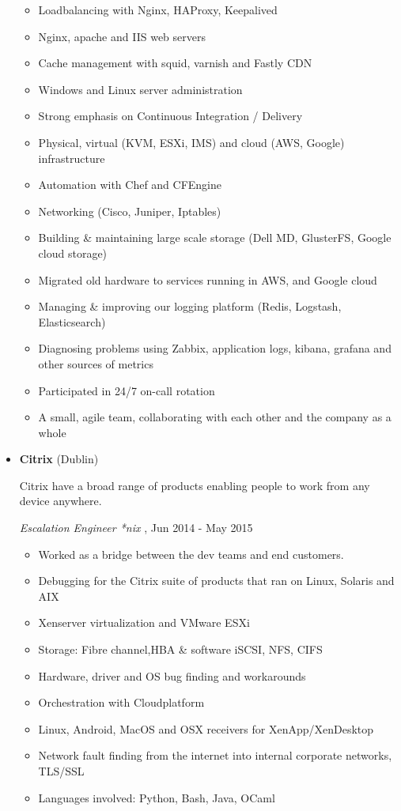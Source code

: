 \documentclass[]{article}
\providecommand{\tightlist}{%
  \setlength{\itemsep}{0pt}\setlength{\parskip}{0pt}}
\begin{document}
\begin{itemize}
  \begin{itemize}
  \tightlist
  \item
    Loadbalancing with Nginx, HAProxy, Keepalived
  \item
    Nginx, apache and IIS web servers
  \item
    Cache management with squid, varnish and Fastly CDN
  \item
    Windows and Linux server administration
  \item
    Strong emphasis on Continuous Integration / Delivery
  \item
    Physical, virtual (KVM, ESXi, IMS) and cloud (AWS, Google)
    infrastructure
  \item
    Automation with Chef and CFEngine
  \item
    Networking (Cisco, Juniper, Iptables)
  \item
    Building \& maintaining large scale storage (Dell MD, GlusterFS,
    Google cloud storage)
  \item
    Migrated old hardware to services running in AWS, and Google cloud
  \item
    Managing \& improving our logging platform (Redis, Logstash,
    Elasticsearch)
  \item
    Diagnosing problems using Zabbix, application logs, kibana, grafana
    and other sources of metrics
  \item
    Participated in 24/7 on-call rotation
  \item
    A small, agile team, collaborating with each other and the company
    as a whole
  \end{itemize}
\item
  \textbf{Citrix} (Dublin)

  Citrix have a broad range of products enabling people to work from any
  device anywhere.

  \emph{Escalation Engineer *nix }, Jun 2014 - May 2015

  \begin{itemize}
  \tightlist
  \item
    Worked as a bridge between the dev teams and end customers.
  \item
    Debugging for the Citrix suite of products that ran on Linux,
    Solaris and AIX
  \item
    Xenserver virtualization and VMware ESXi
  \item
    Storage: Fibre channel,HBA \& software iSCSI, NFS, CIFS
  \item
    Hardware, driver and OS bug finding and workarounds
  \item
    Orchestration with Cloudplatform
  \item
    Linux, Android, MacOS and OSX receivers for XenApp/XenDesktop
  \item
    Network fault finding from the internet into internal corporate
    networks, TLS/SSL
  \item
    Languages involved: Python, Bash, Java, OCaml
  \end{itemize}


\end{itemize}
\end{document}
